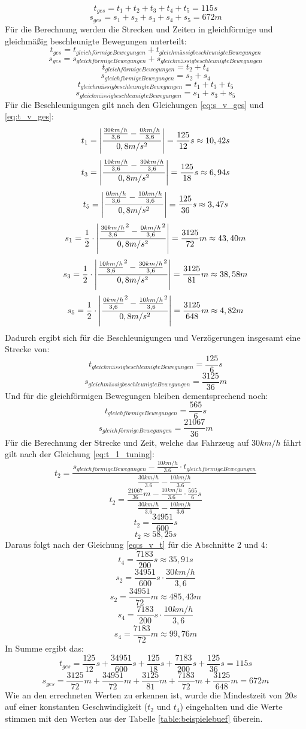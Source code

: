 \[t_{ges} = t_1 + t_2 + t_3 + t_4 + t_5 = 115s\]
\[s_{ges} = s_1 + s_2 + s_3 + s_4 + s_5 = 672m\]
Für die Berechnung werden die Strecken und Zeiten in gleichförmige und gleichmäßig beschleunigte Bewegungen unterteilt:
\[t_{ges} = t_{gleichförmige Bewegungen} + t_{gleichmässig beschleunigte Bewegungen}\]
\[s_{ges} = s_{gleichförmige Bewegungen} + s_{gleichmässig beschleunigte Bewegungen}\]
\[t_{gleichförmige Bewegungen} = t_2 + t_4\]
\[s_{gleichförmige Bewegungen} = s_2 + s_4\]
\[t_{gleichmässig beschleunigte Bewegungen} = t_1 + t_3 + t_5\]
\[s_{gleichmässig beschleunigte Bewegungen} = s_1 + s_3 + s_5\]
Für die Beschleunigungen gilt nach den Gleichungen \ref{eq:s_v_ges} und \ref{eq:t_v_ges}:
\[t_1 = \left\vert\frac{\frac{30km/h}{3,6}-\frac{0km/h}{3,6}}{0,8m/s^{2}}\right\vert = \frac{125}{12}s \approx 10,42s\]
\[t_3 = \left\vert\frac{\frac{10km/h}{3,6}-\frac{30km/h}{3,6}}{0,8m/s^{2}}\right\vert = \frac{125}{18}s \approx 6,94s\]
\[t_5 = \left\vert\frac{\frac{0km/h}{3,6}-\frac{10km/h}{3,6}}{0,8m/s^{2}}\right\vert = \frac{125}{36}s \approx 3,47s\]
\[s_1 = \frac{1}{2}\cdot\left\vert\frac{{\frac{30km/h}{3,6}}^2-{\frac{0km/h}{3,6}}^2}{0,8m/s^{2}}\right\vert = \frac{3125}{72}m \approx 43,40m\]
\[s_3 = \frac{1}{2}\cdot\left\vert\frac{{\frac{10km/h}{3,6}}^2-{\frac{30km/h}{3,6}}^2}{0,8m/s^{2}}\right\vert = \frac{3125}{81}m \approx 38,58m\]
\[s_5 = \frac{1}{2}\cdot\left\vert\frac{{\frac{0km/h}{3,6}}^2-{\frac{10km/h}{3,6}}^2}{0,8m/s^{2}}\right\vert = \frac{3125}{648}m \approx 4,82m\]
Dadurch ergibt sich für die Beschleunigungen und Verzögerungen insgesamt eine Strecke von:
\[t_{gleichmässig beschleunigte Bewegungen} = \frac{125}{6}s\]
\[s_{gleichmässig beschleunigte Bewegungen} = \frac{3125}{36}m\]
Und für die gleichförmigen Bewegungen bleiben dementsprechend noch:
\[t_{gleichförmige Bewegungen} = \frac{565}{6}s\]
\[s_{gleichförmige Bewegungen} = \frac{21067}{36}m\]
Für die Berechnung der Strecke und Zeit, welche das Fahrzeug auf 30$km/h$ fährt gilt nach der Gleichung \ref{eq:t_1_tuning}:
\[t_{2} = \frac{s_{gleichförmige Bewegungen} - \frac{10km/h}{3.6} \cdot t_{gleichförmige Bewegungen}}{\frac{30km/h}{3.6} - \frac{10km/h}{3.6}}\]
\[t_{2} = \frac{\frac{21067}{36}m - \frac{10km/h}{3.6} \cdot \frac{565}{6}s}{\frac{30km/h}{3.6} - \frac{10km/h}{3.6}}\]
\[t_{2} = \frac{34951}{600}s\]
\[t_{2} \approx 58,25s\]
Daraus folgt nach der Gleichung \ref{eq:s_v_t} für die Abschnitte 2 und 4:
\[t_{4} = \frac{7183}{200}s \approx 35,91s\]
\[s_{2} = \frac{34951}{600}s \cdot \frac{30km/h}{3,6}\]
\[s_{2} = \frac{34951}{72}m \approx 485,43m\]
\[s_{4} = \frac{7183}{200}s \cdot \frac{10km/h}{3,6}\]
\[s_{4} = \frac{7183}{72}m \approx 99,76m\]
In Summe ergibt das:
\[t_{ges} = \frac{125}{12}s + \frac{34951}{600}s + \frac{125}{18}s + \frac{7183}{200}s + \frac{125}{36}s = 115s\]
\[s_{ges} = \frac{3125}{72}m + \frac{34951}{72}m + \frac{3125}{81}m + \frac{7183}{72}m + \frac{3125}{648}m = 672m\]
Wie an den errechneten Werten zu erkennen ist, wurde die Mindestzeit von 20$s$ auf einer konstanten Geschwindigkeit ($t_2$ und $t_4$) eingehalten und die Werte stimmen mit den Werten aus der Tabelle \ref{table:beispielebuef} überein.